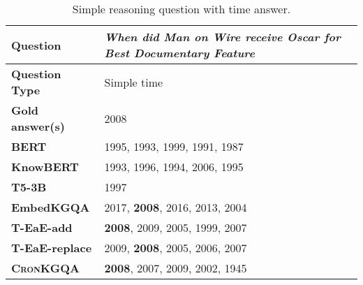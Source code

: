 \documentclass[11pt,a4paper]{article}
\newcommand{\method}{\textsc{CronKGQA}}
\begin{document}
\begin{table*}[t]
\centering
\begin{tabular}{@{}ll@{}}
\toprule
\textbf{Question}       & \textit{When did Man on Wire receive Oscar for Best Documentary Feature} \\ \midrule
\textbf{Question Type}  & Simple time                                                             \\
\textbf{Gold answer(s)} & 2008                                                                     \\ \midrule
\rowcolor[HTML]{EFEFEF} 
\textbf{BERT}           & 1995, 1993, 1999, 1991, 1987                                             \\
\textbf{KnowBERT}       & 1993, 1996, 1994, 2006, 1995                                             \\
\rowcolor[HTML]{EFEFEF} 
\textbf{T5-3B}          & 1997                                                                     \\
\textbf{EmbedKGQA}      & 2017, \textbf{2008}, 2016, 2013, 2004                                             \\
\rowcolor[HTML]{EFEFEF} 
\textbf{T-EaE-add}      & \textbf{2008}, 2009, 2005, 1999, 2007                                             \\
\textbf{T-EaE-replace}  & 2009, \textbf{2008}, 2005, 2006, 2007                                             \\
\rowcolor[HTML]{EFEFEF} 
\textbf{\method{}}    & \textbf{2008}, 2007, 2009, 2002, 1945                                             \\ \bottomrule
\end{tabular}
\caption{Simple reasoning question with time answer.}
\label{tab:example2}
\end{table*}
\end{document}
